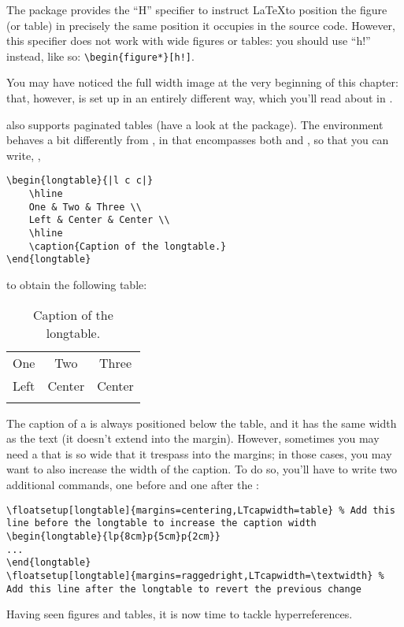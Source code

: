 The  package provides the \enquote{H} specifier to 
instruct \LaTeX to position the figure (or table) in precisely the same 
position it occupies in the source code. However, this specifier does 
not work with wide figures or tables: you should use \enquote{h!} 
instead, like so: \lstinline|\begin{figure*}[h!]|.

You may have noticed the full width image at the very beginning of this
chapter: that, however, is set up in an entirely different way, which
you'll read about in .

 also supports paginated tables (have a look at the 
 package). The 
 environment behaves a bit differently from 
, in that  encompasses both 
 and , so that you can write, 
\eg,

\begin{lstlisting}[caption=Example of a longtable]
\begin{longtable}{|l c c|}
    \hline
    One & Two & Three \\
    Left & Center & Center \\
    \hline
    \caption{Caption of the longtable.}
\end{longtable}
\end{lstlisting}

to obtain the following table:
\begin{longtable}{|l c c|}
    \hline
    One & Two & Three \\
    Left & Center & Center \\
    \hline
    \caption{Caption of the longtable.}
\end{longtable}

The caption of a  is always positioned below the 
table, and it has the same width as the text (it doesn't extend into the 
margin). However, sometimes you may need a  that 
is so wide that it trespass into the margins; in those cases, you may 
want to also increase the width of the caption. To do so, you'll have to 
write two additional commands, one before and one after the 
:

\begin{lstlisting}[caption=Increasing the width of the caption of a \Environment{longtable}.]
\floatsetup[longtable]{margins=centering,LTcapwidth=table} % Add this line before the longtable to increase the caption width
\begin{longtable}{lp{8cm}p{5cm}p{2cm}}
...
\end{longtable}
\floatsetup[longtable]{margins=raggedright,LTcapwidth=\textwidth} % Add this line after the longtable to revert the previous change
\end{lstlisting}

Having seen figures and tables, it is now time to tackle 
hyperreferences.

